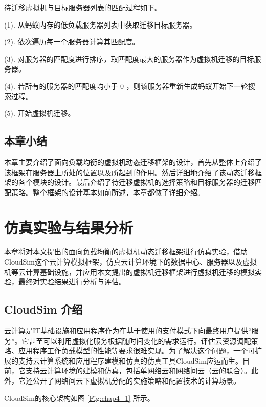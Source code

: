 待迁移虚拟机与目标服务器列表的匹配过程如下。

    (1). 从蚂蚁内存的低负载服务器列表中获取迁移目标服务器。

    (2). 依次遍历每一个服务器计算其匹配度。

    (3). 对服务器的匹配度进行排序，取匹配度最大的服务器作为虚拟机迁移的目标服务器。

    (4). 若所有的服务器的匹配度均小于 0 ，则该服务器重新生成蚂蚁开始下一轮搜索过程。

    (5). 开始虚拟机迁移。

\section{本章小结}
本章主要介绍了面向负载均衡的虚拟机动态迁移框架的设计，首先从整体上介绍了该框架在服务器上所处的位置以及所起到的作用。然后详细地介绍了该动态迁移框架的各个模块的设计。最后介绍了待迁移虚拟机的选择策略和目标服务器的迁移匹配策略。整个框架的设计基本如前所述，本章都做了详细介绍。

\chapter{仿真实验与结果分析}
本章将对本文提出的面向负载均衡的虚拟机动态迁移框架进行仿真实验，借助CloudSim这个云计算模拟框架，仿真云计算环境下的数据中心、服务器以及虚拟机等云计算基础设施，并应用本文提出的虚拟机迁移框架进行虚拟机迁移的模拟实验，最终对实验结果进行分析与评估。

\section{CloudSim 介绍}
云计算是IT基础设施和应用程序作为在基于使用的支付模式下向最终用户提供“服务”。它甚至可以利用虚拟化服务根据随时间变化的需求运行。评估云资源调配策略、应用程序工作负载模型的性能等要求很难实现。为了解决这个问题，一个可扩展的支持云计算系统和应用程序建模和仿真的仿真工具CloudSim应运而生\cite{Atanasov}。目前，它支持云计算环境的建模和仿真，包括单网络云和网络间云（云的联合）。此外，它还公开了网络间云下虚拟机分配的实施策略和配置技术的计算场景。

CloudSim的核心架构如图 \ref{Fig:chap4_1} 所示。

